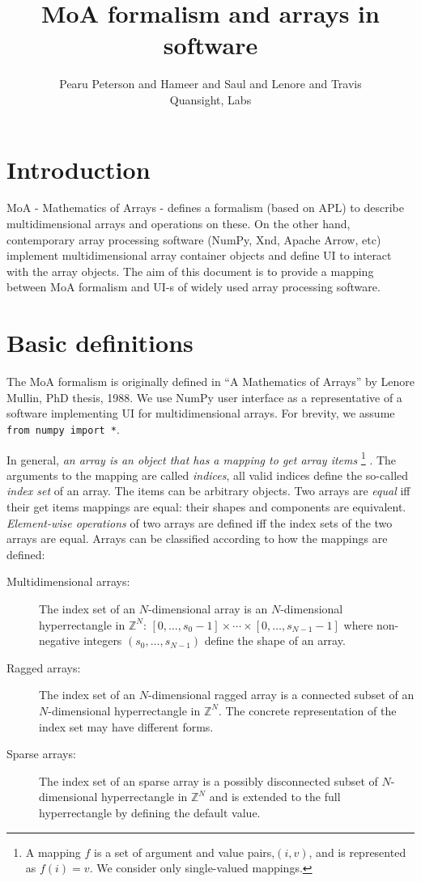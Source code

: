 \documentclass[a4paper,12pt]{article}
\title{MoA formalism and arrays in software}
\author{Pearu Peterson and Hameer and Saul and Lenore and Travis\\
Quansight, Labs}
\newcommand{\Z}{{\mathbb{Z}}}                     %
\begin{document}
\maketitle
\section{Introduction}

MoA - Mathematics of Arrays - defines a formalism (based on APL) to
describe multidimensional arrays and operations on these. On the other
hand, contemporary array processing software (NumPy, Xnd, Apache
Arrow, etc) implement multidimensional array container objects and
define UI to interact with the array objects. The aim of this document
is  to provide a mapping between MoA formalism and UI-s of widely used
array processing software.

\section{Basic definitions}

The MoA formalism is originally defined in ``A Mathematics of Arrays''
by Lenore Mullin, PhD thesis, 1988\cite{mul00}.  We use NumPy
\cite{travis0} user interface as a representative of a software
implementing UI for multidimensional arrays. For brevity, we assume
\verb+from numpy import *+.

\noindent
In general, \emph{an array is an object that has a mapping to get
  array items} \footnote{A mapping $f$ is a set of argument and value
  pairs,$(i,v)$, and is represented as $f(i)=v$. We consider only
  single-valued mappings.} . The arguments to the mapping are called
\emph{indices}, all valid indices define the so-called \emph{index
  set} of an array. The items can be arbitrary objects.
Two arrays are \emph{equal} iff their get items mappings are equal: their shapes and components are equivalent.
\emph{Element-wise operations} of two arrays are defined iff the index
sets of the two arrays are equal.
Arrays can be classified according to how the mappings are defined:
\begin{description}
\item[Multidimensional arrays:] The index set of
  an $N$-dimensional array is an $N$-dimensional hyperrectangle in
  $\Z^N$: $[0,\ldots,s_0-1]\times\cdots\times[0,\ldots,s_{N-1}-1]$
  where non-negative integers $(s_0,\ldots,s_{N-1})$ define the shape
  of an array.
\item[Ragged arrays:] The index set of an
  $N$-dimensional ragged array is a connected subset of an
  $N$-dimensional hyperrectangle in $\Z^N$. The concrete
  representation of the index set may have different forms.
\item[Sparse arrays:] The index set of an sparse array is a possibly
  disconnected subset of $N$-dimensional hyperrectangle in $\Z^N$ and
  is extended to the full hyperrectangle by defining the default
  value.
\end{description}
\end{document}
